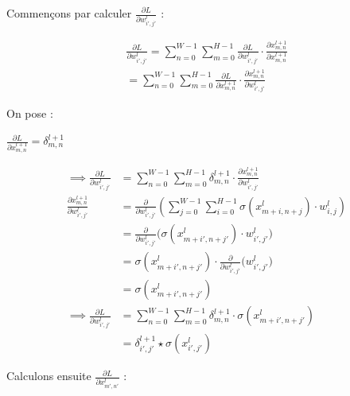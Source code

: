 \begin{multicols}{2}
Commençons par calculer $\frac{\partial L}{\partial w_{i',j'}^{l}}$ : 

{\scriptsize
\begin{align}
\frac{\partial L}{\partial w_{i',j'}^{l}} = \sum_{n=0}^{W-1}\sum_{m=0}^{H-1}\frac{\partial L}{\partial w_{i',j'}^{l}}\cdot\frac{\partial x_{m,n}^{l+1}}{\partial x_{m,n}^{l+1}}\\
= \sum_{n=0}^{W-1}\sum_{m=0}^{H-1}\frac{\partial L}{\partial x_{m,n}^{l+1}}\cdot\frac{\partial x_{m,n}^{l+1}}{\partial w_{i',j'}^{l}}
\end{align}}

On pose : 

$\frac{\partial{L}}{\partial{x_{m,n}^{l+1}}} = \delta^{l+1}_{m,n}$

{\scriptsize
\begin{align}
\implies \frac{\partial L}{\partial w_{i',j'}^{l}} &=  \sum_{n=0}^{W-1}\sum_{m=0}^{H-1}\delta^{l+1}_{m,n}\cdot\frac{\partial x_{m,n}^{l+1}}{\partial w_{i',j'}^{l}}\\
\frac{\partial x_{m,n}^{l+1}}{\partial w_{i',j'}^{l}}&= \frac{\partial}{\partial w_{i',j'}^{l}}\left(\sum_{j=0}^{W-1}\sum_{i=0}^{H-1}\sigma(x^{l}_{m+i, n+j}) \cdot w^{l}_{i,j}\right)\\
&= \frac{\partial}{\partial w^{l}_{i',j'}}\big (\sigma(x^{l}_{m+i', n+j'}) \cdot w^{l}_{i',j'}\big )\\
&= \sigma(x^{l}_{m+i', n+j'}) \cdot \frac{\partial}{\partial w^{l}_{i',j'}}\big (w^{l}_{i',j'}\big )\\
&= \sigma(x^{l}_{m+i',n+j'})\\
\implies \frac{\partial L}{\partial w_{i',j'}^{l}} &=  \sum_{n=0}^{W-1}\sum_{m=0}^{H-1}\delta^{l+1}_{m,n}\cdot\sigma(x^{l}_{m+i',n+j'})\\
&= \delta^{l+1}_{i',j'} \star \sigma(x^{l}_{i',j'})
\end{align}}

Calculons ensuite $\frac{\partial L}{\partial x^{l}_{m',n'}}$ : 


\end{multicols}
